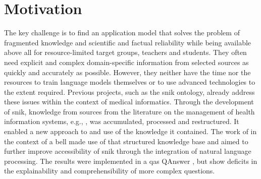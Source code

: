 \section{Motivation}\label{sec:motivation}

The key challenge is to find an application model that solves the problem of fragmented knowledge and scientific and factual reliability while being available above all for resource-limited target groups, teachers and students.
They often need explicit and complex domain-specific information from selected sources as quickly and accurately as possible. 
However, they neither have the time nor the resources to train language models themselves or to use advanced technologies to the extent required.
%
Previous projects, such as the \ac{snik} ontology, already address these issues within the context of medical informatics.
Through the development of \ac{snik}, knowledge from sources from the literature on the management of health information systems, e.g., \citet{bb2}, was accumulated, processed and restructured.    
It enabled a new approach to and use of the knowledge it contained. 
The work of \citep{hannesbell, hannesbell_skill} in the context of a \ac{bell} made use of that structured knowledge base and aimed to further improve accessibility of \ac{snik} through the integration of natural language processing.    
The results were implemented in a \ac{qas} QAnswer \citep{qanswer}, but show deficits in the explainability and comprehensibility of more complex questions. 
